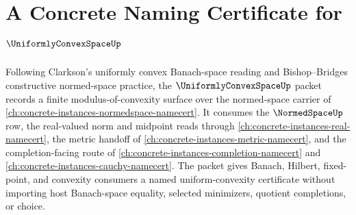 \chapter{A Concrete Naming Certificate for $\UniformlyConvexSpaceUp$}
\label{ch:concrete-instances-uniformly-convex-space-namecert}

Following Clarkson's uniformly convex Banach-space reading and Bishop--Bridges constructive normed-space practice, the $\UniformlyConvexSpaceUp$ packet records a finite modulus-of-convexity surface over the normed-space carrier of \autoref{ch:concrete-instances-normedspace-namecert}. It consumes the $\NormedSpaceUp$ row, the real-valued norm and midpoint reads through \autoref{ch:concrete-instances-real-namecert}, the metric handoff of \autoref{ch:concrete-instances-metric-namecert}, and the completion-facing route of \autoref{ch:concrete-instances-completion-namecert} and \autoref{ch:concrete-instances-cauchy-namecert}. The packet gives Banach, Hilbert, fixed-point, and convexity consumers a named uniform-convexity certificate without importing host Banach-space equality, selected minimizers, quotient completions, or choice.

